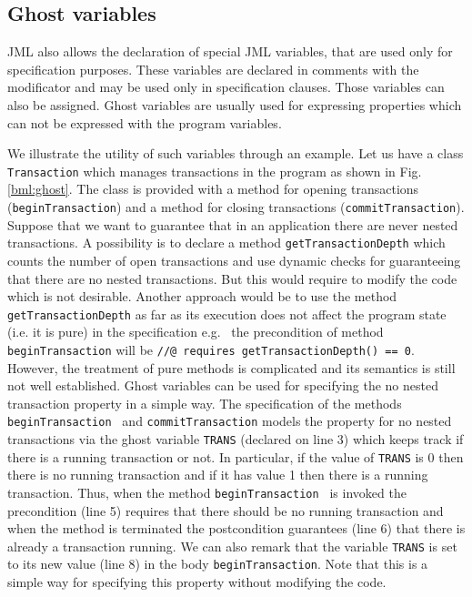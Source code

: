\subsection{Ghost variables}\label{javaVerif:JML:ghost} 
 JML also allows the declaration of special JML variables, that are used only for specification purposes. 
 These variables are declared in comments with the  modificator and may be used only in specification clauses. Those variables 
 can also be assigned. Ghost variables are usually used  for expressing properties which can not be expressed with the program variables.

 We illustrate the utility of such variables through an example. 
 Let us have a class \texttt{Transaction}  which manages transactions in the program as shown in  Fig. \ref{bml:ghost}.  
 The class is provided with a method for opening transactions (\texttt{beginTransaction}) and 
 a method for closing transactions (\texttt{commitTransaction}). Suppose that we want to guarantee that in an application 
 there are never nested transactions. A possibility is to declare a method \texttt{getTransactionDepth} which counts the number
 of open transactions and use dynamic checks  for guaranteeing that there are no nested transactions. But this would require to modify the code which is not desirable. 
Another approach would be to use the method  \texttt{getTransactionDepth}  as far as its execution
 does not affect the program state (i.e. it is pure) in the specification 
 e.g. \ the precondition  of method \texttt{beginTransaction} will be \texttt{//@ requires getTransactionDepth() == 0}.
However,  the treatment of pure methods is  complicated and its semantics is still not well established.
 Ghost variables can be used for specifying the no nested transaction property in a simple way.
  The specification of the methods \texttt{beginTransaction } and \texttt{commitTransaction}
 models the property for no nested transactions via the ghost variable
 \texttt{TRANS} (declared on line 3) which keeps track if there is  a running transaction or not. In particular, 
 if the value of  \texttt{TRANS} is 0 then there is no running transaction and if it has value 1 then there is
 a running transaction.  Thus, when the method  \texttt{beginTransaction } is invoked the precondition (line 5) requires
 that there should be no running transaction and when the method is terminated the postcondition guarantees (line 6) that there is already a transaction running.
 We can also remark that the variable  \texttt{TRANS} is set to its new value (line 8) in the  body  \texttt{beginTransaction}.
Note that this is a simple way for specifying this property without modifying the code. 

